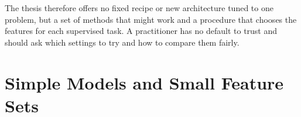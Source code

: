 The thesis therefore offers no fixed recipe or new architecture tuned to one problem, but a set of methods that might work and a procedure that chooses the features for each supervised task. A practitioner has no default to trust and should ask which settings to try and how to compare them fairly.



\section{Simple Models and Small Feature Sets}
